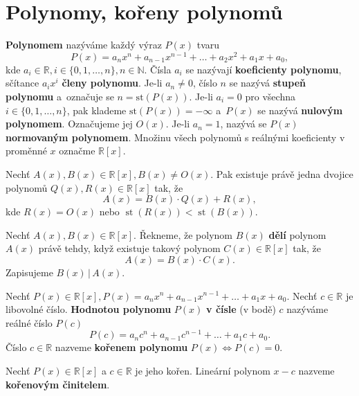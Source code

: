\section{Polynomy, kořeny polynomů}
\begin{definition}
  \textbf{Polynomem} nazýváme každý výraz $P(x)$ tvaru
  \[
    P(x)=a_nx^n + a_{n-1}x^{n-1}+\dots + a_2x^2+a_1x+a_0,
  \]
  kde $a_i\in \mathbb R, i\in \{ 0,1,\dots , n \},n\in \mathbb N$. Čísla $a_i$ se nazývají \textbf{koeficienty polynomu}, sčítance $a_ix^i$ \textbf{členy polynomu}.
  Je-li $a_n\ne 0$, číslo $n$ se nazývá \textbf{stupeň polynomu} a~označuje se $n= \text{st}(P(x))$.
  Je-li $a_i=0$ pro všechna $i \in \{ 0,1,\dots ,n\}$, pak klademe $\text{st}(P(x))=-\infty$ a~$P(x)$ se nazývá \textbf{nulovým polynomem}.
  Označujeme jej $O(x).$ Je-li $a_n=1$, nazývá se $P(x)$ \textbf{normovaným polynomem}. Množinu všech polynomů s reálnými koeficienty v proměnné $x$ označme $\mathbb R[x]$.
\end{definition}

\begin{veta}
  Nechť $A(x), B(x) \in \mathbb R[x],B(x) \ne O(x).$ Pak existuje právě jedna dvojice polynomů $Q(x),R(x)\in \mathbb R[x]$ tak, že
  \[
    A(x)=B(x)\cdot Q(x)+R(x),
  \]
  kde $R(x)=O(x)$ nebo $\operatorname{st}(R(x))<\operatorname{st}(B(x)).$
\end{veta}

\begin{definition}
  Nechť $A(x), B(x) \in \mathbb R[x]$. Řekneme, že polynom $B(x)$ \textbf{dělí} polynom $A(x)$ právě tehdy, když existuje takový polynom $C(x) \in \mathbb R[x]$ tak, že
  \[
    A(x) = B(x)\cdot C(x).
  \]
  Zapisujeme $B(x) \, | \, A(x).$
\end{definition}

\begin{definition}
  Nechť $P(x)\in \mathbb R[x], P(x)=a_nx^n+a_{n-1}x^{n-1}+\dots +a_1x+a_0.$ Nechť $c\in \mathbb R$ je libovolné číslo. \textbf{Hodnotou polynomu} $P(x)$ \textbf{v čísle} (v bodě) $c$ nazýváme reálné číslo $P(c)$
  \[
    P(c) = a_nc^n+a_{n-1}c^{n-1}+\dots+a_1c+a_0.
  \]
  Číslo $c\in \mathbb R$ nazveme \textbf{kořenem polynomu} $P(x) \iff P(c) = 0$.
\end{definition}


\begin{definition}
  Nechť $P(x) \in \mathbb R [x]$ a $c\in \mathbb R$ je jeho kořen. Lineární polynom $x-c$ nazveme \textbf{kořenovým činitelem}.
\end{definition}


